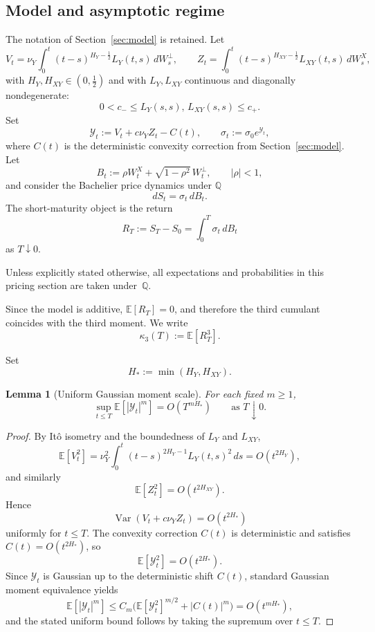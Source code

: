 \documentclass[11pt,a4paper]{amsart}
\theoremstyle{plain}
\newtheorem{lemma}[theorem]{Lemma}
\theoremstyle{definition}
\theoremstyle{remark}
\DeclareMathOperator{\Var}{Var}
\newcommand{\Q}{\mathbb{Q}}
\newcommand{\EE}{\mathbb{E}}
\begin{document}
\subsection{Model and asymptotic regime}

The notation of Section~\ref{sec:model} is retained. Let
\[
V_t
=
\nu_Y \int_0^t (t-s)^{H_Y-\frac12}L_Y(t,s)\,dW_s^\perp,
\qquad
Z_t
=
\int_0^t (t-s)^{H_{XY}-\frac12}L_{XY}(t,s)\,dW_s^X,
\]
with $H_Y,H_{XY}\in(0,\tfrac12)$ and with $L_Y,L_{XY}$ continuous and diagonally nondegenerate:
\[
0<c_- \le L_Y(s,s),\,L_{XY}(s,s)\le c_+.
\]
Set
\[
\mathcal Y_t := V_t + c\nu_Y Z_t - C(t),
\qquad
\sigma_t := \sigma_0 e^{\mathcal Y_t},
\]
where $C(t)$ is the deterministic convexity correction from Section~\ref{sec:model}. Let
\[
B_t := \rho W_t^X + \sqrt{1-\rho^2}\,W_t^\perp,
\qquad |\rho|<1,
\]
and consider the Bachelier price dynamics under $\Q$
\[
dS_t = \sigma_t\,dB_t.
\]
The short-maturity object is the return
\[
R_T := S_T-S_0 = \int_0^T \sigma_t\,dB_t
\]
as $T\downarrow 0$.

Unless explicitly stated otherwise, all expectations and probabilities in this pricing section are
taken under~$\Q$.

Since the model is additive, $\EE[R_T]=0$, and therefore the third cumulant coincides with the third moment. We write
\[
\kappa_3(T):=\EE[R_T^3].
\]

Set
\[
H_*:=\min(H_Y,H_{XY}).
\]

\begin{lemma}[Uniform Gaussian moment scale]\label{lem:vol-moment-scale}
For each fixed \(m\ge1\),
\begin{equation}\label{eq:vol_moment_bound}
\sup_{t\le T}\EE[|\mathcal Y_t|^m]=O(T^{mH_*})
\qquad\text{as }T\downarrow0.
\end{equation}
\end{lemma}

\begin{proof}
By It\^o isometry and the boundedness of \(L_Y\) and \(L_{XY}\),
\[
\EE[V_t^2]
=
\nu_Y^2\int_0^t (t-s)^{2H_Y-1}L_Y(t,s)^2\,ds
=
O(t^{2H_Y}),
\]
and similarly
\[
\EE[Z_t^2]=O(t^{2H_{XY}}).
\]
Hence
\[
\Var(V_t+c\nu_Y Z_t)=O(t^{2H_*})
\]
uniformly for \(t\le T\).  The convexity correction \(C(t)\) is deterministic and satisfies
\(C(t)=O(t^{2H_*})\), so
\[
\EE[\mathcal Y_t^2]=O(t^{2H_*}).
\]
Since \(\mathcal Y_t\) is Gaussian up to the deterministic shift \(C(t)\), standard Gaussian
moment equivalence yields
\[
\EE[|\mathcal Y_t|^m]
\le
C_m\bigl(\EE[\mathcal Y_t^2]^{m/2}+|C(t)|^m\bigr)
=
O(t^{mH_*}),
\]
and the stated uniform bound follows by taking the supremum over \(t\le T\).
\end{proof}
\end{document}
